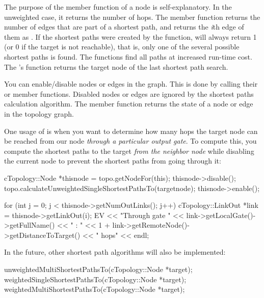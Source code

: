 The purpose of the  member function of a
node is self-explanatory. In the unweighted case, it returns the
number of hops. The  member function returns the number
of edges that are part of a shortest path, and
 returns the \textit{i}th edge of them as
. If the shortest paths were created by the
 function,
 will always return 1 (or 0 if the target is not
reachable), that is, only one of the several possible shortest paths
is found. The
 functions
find all paths at increased run-time cost. The 's
 function returns the target node of the last
shortest path search.

You can enable/disable nodes or edges in the graph. This is done by
calling their  or  member functions.
Disabled nodes or edges are ignored by the shortest paths calculation
algorithm. The  member function returns the state of
a node or edge in the topology graph.

One usage of  is when you want to determine how many
hops the target node can be reached from our node \textit{through
a particular output gate}. To compute this, you compute the
shortest paths to the target \textit{from the neighbor node} while
disabling the current node to prevent the shortest paths
from going through it:

\begin{cpp}
cTopology::Node *thisnode = topo.getNodeFor(this);
thisnode->disable();
topo.calculateUnweightedSingleShortestPathsTo(targetnode);
thisnode->enable();

for (int j = 0; j < thisnode->getNumOutLinks(); j++) {
  cTopology::LinkOut *link = thisnode->getLinkOut(i);
  EV << "Through gate " << link->getLocalGate()->getFullName() << " : "
     << 1 + link->getRemoteNode()->getDistanceToTarget() << " hops" << endl;
}
\end{cpp}

In the future, other shortest path algorithms will also be implemented:

\begin{cpp}
unweightedMultiShortestPathsTo(cTopology::Node *target);
weightedSingleShortestPathsTo(cTopology::Node *target);
weightedMultiShortestPathsTo(cTopology::Node *target);
\end{cpp}

